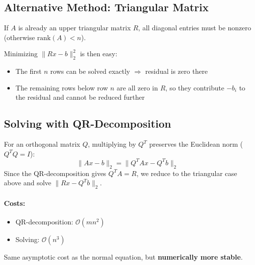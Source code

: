 \documentclass{article}
\begin{document}
\subsection{Alternative Method: Triangular Matrix}
If $A$ is already an upper triangular matrix $R$, all diagonal entries must be nonzero
(otherwise $\mathrm{rank}(A) < n$).

Minimizing $\|Rx - b\|_2^2$ is then easy:
\begin{itemize}
  \item The first $n$ rows can be solved exactly $\Rightarrow$ residual is zero there
  \item The remaining rows below row $n$ are all zero in $R$, so they contribute
        $-b_i$ to the residual and cannot be reduced further
\end{itemize}

\subsection{Solving with QR-Decomposition}
For an orthogonal matrix $Q$, multiplying by $Q^T$ preserves the Euclidean norm
($Q^TQ = I$):
\[
  \|Ax - b\|_2 = \|Q^TAx - Q^Tb\|_2
\]
Since the QR-decomposition gives $Q^TA = R$, we reduce to the triangular case above
and solve $\|Rx - Q^Tb\|_2$.

\paragraph{Costs:}
\begin{itemize}
  \item QR-decomposition: $\mathcal{O}(mn^2)$
  \item Solving: $\mathcal{O}(n^3)$
\end{itemize}
Same asymptotic cost as the normal equation, but \textbf{numerically more stable}.
\end{document}

